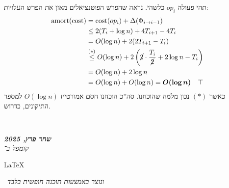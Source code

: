 \documentclass[]{article}
\newcommand\en[1] {\begin{otherlanguage}{english}#1\end{otherlanguage}}
\newcommand\ndoc  {\dotfill \\ \vfil {\begin{center}
            {\textbf{\textit{שחר פרץ, 2025}} \\
                \scriptsize \textit{קומפל ב־}\en{\LaTeX}\,\textit{ ונוצר באמצעות תוכנה חופשית בלבד}}
    \end{center}} \vfil	}
\newcommand\logn  {\log n}
\newcommand\Dg        {\Delta}
\newcommand\cl [1]    {\left ( #1 \right )}
\theoremstyle{definition}
\DeclareMathOperator\amort   {amort}
\DeclareMathOperator\cost    {cost}
\begin{document}
\begin{enumerate}[A.]
        תהי פעולה $op_i$ כלשהי. נראה שהפרש הפוטנציאלים מאזן את הפרש העלויות: 
        \begin{align*}
            \amort(\cost) &= \cost(op_i) + \Dg(\Phi_{i \to i - 1}) \\
            &\le 2(T_i + \logn) + 4T_{i + 1} - 4T_{i} \\
            &=O(\logn) + 2(2T_{i+ 1} - T_i) \\
            &\overset{(*)}{\le} O(\logn) + 2\cl{\cancel{2} \cdot \frac{T_i}{\cancel{2}} + 2\logn - T_i} \\
            &= O(\logn) + 2\logn \\
            &= O(\logn) + O(\logn) = \bm{O(\logn)} \quad \top
        \end{align*}
        כאשר $(*)$ נכון מלמה שהוכחנו. סה''כ הוכחנו חסם אמורטייז $O(\logn)$ למספר התיקונים, כדרוש. 
        
        
        
    \end{enumerate}
    
    
    \ndoc
\end{document}
